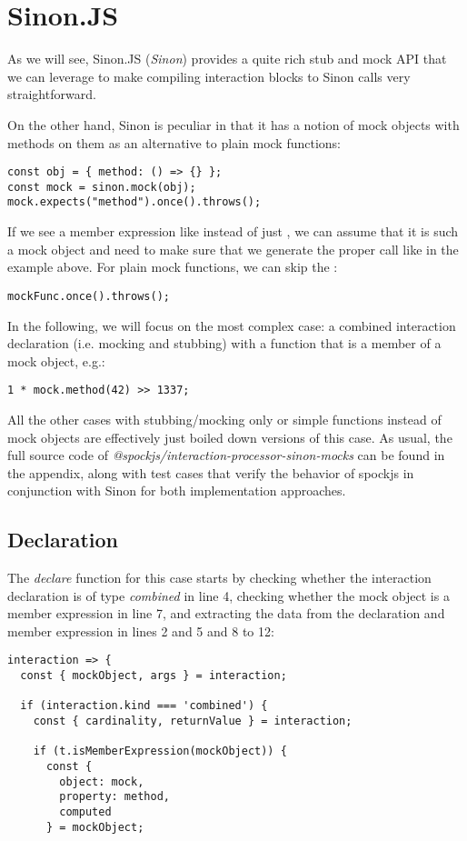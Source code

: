 \section{Sinon.JS}
As we will see,
Sinon.JS (\textit{Sinon}) provides a
quite rich stub and mock API
that we can leverage to make
compiling interaction blocks
to Sinon calls very straightforward.

On the other hand,
Sinon is peculiar in that it has a notion of
mock objects with methods on them
as an alternative to plain mock functions:
\autocite{SinonMockDoc}
\begin{verbatim}
const obj = { method: () => {} };
const mock = sinon.mock(obj);
mock.expects("method").once().throws();
\end{verbatim}
If we see a member expression like
instead of just
,
we can assume that it is such a mock object
and need to make sure that
we generate the proper  call
like in the example above.
For plain mock functions,
we can skip the :
\begin{verbatim}
mockFunc.once().throws();
\end{verbatim}

In the following,
we will focus on the most complex case:
a combined interaction declaration
(i.e. mocking and stubbing) with a
function that is a member of a mock object, e.g.:
\begin{verbatim}
1 * mock.method(42) >> 1337;
\end{verbatim}
All the other cases with
stubbing/mocking only
or simple functions
instead of mock objects
are effectively just
boiled down versions of this case.
As usual, the full source code of
\textit{@spockjs/interaction-processor-sinon-mocks}
can be found in the appendix,
along with test cases that verify
the behavior of spockjs in conjunction with Sinon
for both implementation approaches.

\subsection{Declaration}
The \textit{declare} function for this case starts by
checking whether the interaction declaration is of type \textit{combined} in line 4,
checking whether the mock object is a member expression in line 7, and
extracting the data from the declaration and member expression
in lines 2 and 5 and 8 to 12:
\begin{verbatim}
interaction => {
  const { mockObject, args } = interaction;

  if (interaction.kind === 'combined') {
    const { cardinality, returnValue } = interaction;

    if (t.isMemberExpression(mockObject)) {
      const {
        object: mock,
        property: method,
        computed
      } = mockObject;
\end{verbatim}


